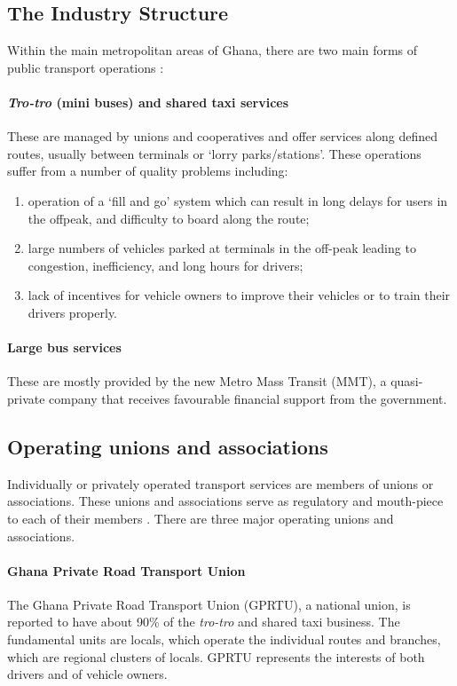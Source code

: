 \subsection{The Industry Structure}
Within the main metropolitan areas of Ghana, there are two main forms of public transport operations \citep{finn2009new}:

	\paragraph{\textit{Tro-tro} (mini buses) and shared taxi services} These are managed by unions and cooperatives and offer services along defined routes, usually between terminals or ‘lorry parks/stations’. These operations suffer from a number of quality problems including:
	\begin{enumerate}
		\item operation of a ‘fill and go’ system which can result in long delays for users in the offpeak, and difficulty to board along the route;
		\item large numbers of vehicles parked at
		terminals in the off-peak leading to congestion, inefficiency, and long hours for
		drivers; 
		\item lack of incentives for vehicle owners to improve their vehicles or to train their drivers properly.
	\end{enumerate}
\paragraph{Large bus services} These are mostly provided by the new Metro Mass Transit (MMT), a quasi-private company that receives favourable financial support from the government.


\subsection{Operating unions and associations}
Individually or privately operated transport services are members of unions or associations. These unions and associations serve as regulatory and mouth-piece to each of their members \citep{fouracre1994public}. There are three major operating unions and associations.

\paragraph{Ghana Private Road Transport Union}
The Ghana Private Road Transport Union (GPRTU), a national union, is reported to have about 90\% of the \textit{tro-tro} and shared taxi business. The fundamental units are locals, which operate the individual routes and branches, which are regional clusters of locals. GPRTU represents the interests of both drivers and of vehicle owners.

